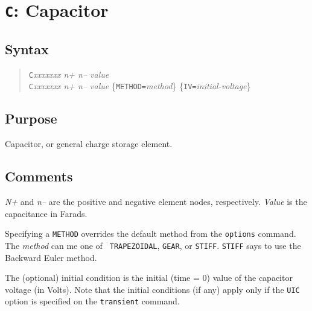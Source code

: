 \section{{\tt C}: Capacitor}
\subsection{Syntax}
\begin{verse}
{\tt C}{\it xxxxxxx n+ n-- value}\\
{\tt C}{\it xxxxxxx n+ n-- value} \{{\tt METHOD=}{\it method}\} 
\{{\tt IV=}{\it initial-voltage}\}

\end{verse}
\subsection{Purpose}

Capacitor, or general charge storage element.
\subsection{Comments}

{\it N+} and {\it n--} are the positive and negative element nodes,
respectively.  {\it Value} is the capacitance in Farads.

Specifying a {\tt METHOD} overrides the default method from the
{\tt options} command.  The {\it method} can me one of {\tt
TRAPEZOIDAL}, {\tt GEAR}, or {\tt STIFF}.  {\tt STIFF} says to use
the Backward Euler method.

The (optional) initial condition is the initial (time = 0) value of the
capacitor voltage (in Volts).  
Note that the initial conditions (if any)
apply only if the {\tt UIC} option is specified on the {\tt transient}
command.

